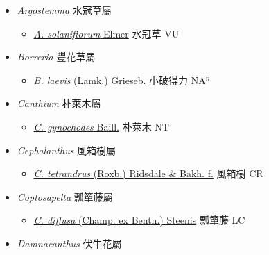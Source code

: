 
  \begin{itemize}
 \item[] \textit{Argostemma} 水冠草屬
                    
  \begin{itemize}
        \item[] \href{http://www.theplantlist.org/tpl1.1/search?q=Argostemma+solaniflorum}{\textit{A. solaniflorum} Elmer}   水冠草 VU
  \end{itemize}
 \item[] \textit{Borreria} 豐花草屬
                    
  \begin{itemize}
        \item[] \href{http://www.theplantlist.org/tpl1.1/search?q=Borreria+laevis}{\textit{B. laevis} (Lamk.) Grieseb.}   小破得力 NA$^n$
  \end{itemize}
 \item[] \textit{Canthium} 朴萊木屬
                    
  \begin{itemize}
        \item[] \href{http://www.theplantlist.org/tpl1.1/search?q=Canthium+gynochodes}{\textit{C. gynochodes} Baill.}   朴萊木 NT
  \end{itemize}
 \item[] \textit{Cephalanthus} 風箱樹屬
                    
  \begin{itemize}
        \item[] \href{http://www.theplantlist.org/tpl1.1/search?q=Cephalanthus+tetrandrus}{\textit{C. tetrandrus} (Roxb.) Ridsdale \& Bakh. f.}     風箱樹 CR
  \end{itemize}
 \item[] \textit{Coptosapelta} 瓢簞藤屬
                    
  \begin{itemize}
        \item[] \href{http://www.theplantlist.org/tpl1.1/search?q=Coptosapelta+diffusa}{\textit{C. diffusa} (Champ. ex Benth.) Steenis}   瓢簞藤 LC
  \end{itemize}
 \item[] \textit{Damnacanthus} 伏牛花屬
                    

\end{itemize}
